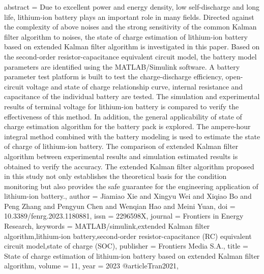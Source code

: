 {{{{{{{{{{   abstract = {Due to excellent power and energy density, low self-discharge and long life, lithium-ion battery plays an important role in many fields. Directed against the complexity of above noises and the strong sensitivity of the common Kalman filter algorithm to noises, the state of charge estimation of lithium-ion battery based on extended Kalman filter algorithm is investigated in this paper. Based on the second-order resistor-capacitance equivalent circuit model, the battery model parameters are identified using the MATLAB/Simulink software. A battery parameter test platform is built to test the charge-discharge efficiency, open-circuit voltage and state of charge relationship curve, internal resistance and capacitance of the individual battery are tested. The simulation and experimental results of terminal voltage for lithium-ion battery is compared to verify the effectiveness of this method. In addition, the general applicability of state of charge estimation algorithm for the battery pack is explored. The ampere-hour integral method combined with the battery modeling is used to estimate the state of charge of lithium-ion battery. The comparison of extended Kalman filter algorithm between experimental results and simulation estimated results is obtained to verify the accuracy. The extended Kalman filter algorithm proposed in this study not only establishes the theoretical basis for the condition monitoring but also provides the safe guarantee for the engineering application of lithium-ion battery.},
   author = {Jiamiao Xie and Xingyu Wei and Xiqiao Bo and Peng Zhang and Pengyun Chen and Wenqian Hao and Meini Yuan},
   doi = {10.3389/fenrg.2023.1180881},
   issn = {2296598X},
   journal = {Frontiers in Energy Research},
   keywords = {MATLAB/simulink,extended Kalman filter algorithm,lithium-ion battery,second-order resistor-capacitance (RC) equivalent circuit model,state of charge (SOC)},
   publisher = {Frontiers Media S.A.},
   title = {State of charge estimation of lithium-ion battery based on extended Kalman filter algorithm},
   volume = {11},
   year = {2023}
}
@article{Tran2021,
}}}}}}}}}}
